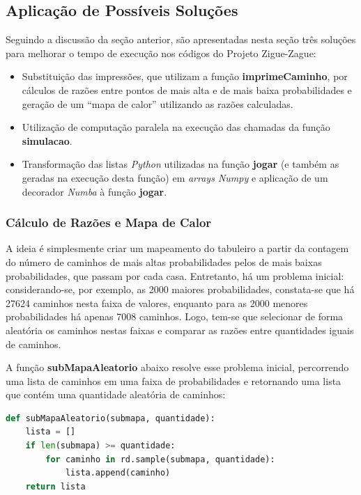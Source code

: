 \documentclass[12pt]{article}
\newcommand{\aspas}[1]{``#1''} %
\begin{document}
\subsection{Aplicação de Possíveis Soluções}
\label{solucoes}


Seguindo a discussão da seção anterior, são apresentadas nesta seção três soluções para melhorar o tempo de execução nos códigos do Projeto Zigue-Zague:

\begin{itemize}
	\item Substituição das impressões, que utilizam a função \textbf{imprimeCaminho}, por cálculos de razões entre pontos de mais alta e de mais baixa probabilidades e geração de um \aspas{mapa de calor} utilizando as razões calculadas.
	\item Utilização de computação paralela na execução das chamadas da função \textbf{simulacao}.
	\item Transformação das listas \textit{Python} utilizadas na função \textbf{jogar} (e também as geradas na execução desta função) em \textit{arrays Numpy} e aplicação de um decorador \textit{Numba} à função \textbf{jogar}.
\end{itemize}

\subsubsection{Cálculo de Razões e Mapa de Calor}

A ideia é simplesmente criar um mapeamento do tabuleiro a partir da contagem do número de caminhos de mais altas probabilidades pelos de mais baixas probabilidades, que passam por cada casa. Entretanto, há um problema inicial: considerando-se, por exemplo, as 2000 maiores probabilidades, constata-se que há 27624 caminhos nesta faixa de valores, enquanto para as 2000 menores probabilidades há apenas 7008 caminhos. Logo, tem-se que selecionar de forma aleatória os caminhos nestas faixas e comparar as razões entre quantidades iguais de caminhos.

A função \textbf{subMapaAleatorio} abaixo resolve esse problema inicial, percorrendo uma lista de caminhos em uma faixa de probabilidades e retornando uma lista que contém uma quantidade aleatória de caminhos:

\begin{lstlisting}[language=Python]
def subMapaAleatorio(submapa, quantidade):
	lista = []
	if len(submapa) >= quantidade:
		for caminho in rd.sample(submapa, quantidade):
			lista.append(caminho)
	return lista
\end{lstlisting}
\end{document}
